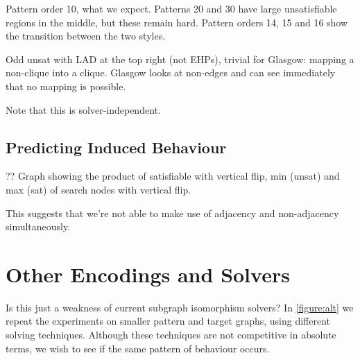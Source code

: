 \documentclass[letterpaper]{article}
\begin{document}
Pattern order 10, what we expect. Patterns 20 and 30 have large unsatisfiable regions in the middle,
but these remain hard. Pattern orders 14, 15 and 16 show the transition between the two styles.

Odd unsat with LAD at the top right (not EHPs), trivial for Glasgow: mapping a non-clique into a
clique. Glasgow looks at non-edges and can see immediately that no mapping is possible.

Note that this is solver-independent.

\lipsum[8]

\begin{figure*}[t]
    
    \caption{Behaviour of algorithms on the induced variant, shown in the style
    of \cref{figure:non-induced}. The second row shows a bound on the satisfiable region, by
    considering where a \emph{non-}induced isomorphism may also be a non-induced isomorphism between
    complement graphs.}\label{figure:induced}
\end{figure*}

\subsection{Predicting Induced Behaviour}

?? Graph showing the product of satisfiable with vertical flip, min (unsat) and max (sat) of search
nodes with vertical flip.

This suggests that we're not able to make use of adjacency and non-adjacency simultaneously.

\lipsum[10]

\section{Other Encodings and Solvers}

\begin{figure*}[t]
    
    \caption{Behaviour of other solvers on the induced variant on smaller graphs, shown in the style of
        \cref{figure:non-induced}. The second row shows the number of search nodes used by the Glasgow
        algorithm, the third row shows the number of decisions made by the Clasp pseudo-boolean solver,
        the fourth row shows the number of search nodes used by a clique encoding, and the fifth a mixed
        integer encoding with Gurobi.}\label{figure:alt}
\end{figure*}

Is this just a weakness of current subgraph isomorphism solvers? In \cref{figure:alt} we repeat the
experiments on smaller pattern and target graphs, using different solving techniques. Although these
techniques are not competitive in absolute terms, we wish to see if the same pattern of behaviour
occurs.
\end{document}
